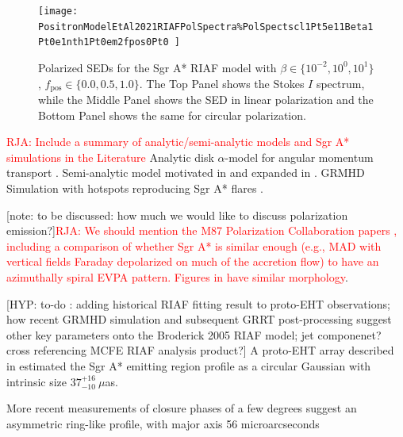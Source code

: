 \documentclass[twocolumn,tighten,dvipsnames,linenumbers]{aastex63}
\newcommand\note[1]{{\color{OliveGreen}[note: #1]}}
\newcommand\hyp[1]{{\color{Salmon}[HYP: #1]}}
\begin{document}
\begin{figure}%
  \texttt{[image: PositronModelEtAl2021RIAFPolSpectra\%PolSpectscl1Pt5e11Beta1Pt0e1nth1Pt0em2fpos0Pt0
]}
  \caption{Polarized SEDs for the Sgr A* RIAF model with  $\beta\in\{10^{-2},10^{0},10^{1}\}$, $f_\mathrm{pos}\in\{0.0,0.5,1.0\}$. The Top Panel shows the Stokes $I$ spectrum, while the Middle Panel shows the SED in linear polarization and the Bottom Panel shows the same for circular polarization.}
  \label{fig:EmamiRIAFSpectra}
\end{figure}

\textcolor{red}{RJA: Include a summary of analytic/semi-analytic models and Sgr A* simulations in the Literature} Analytic disk $\alpha$-model for angular momentum transport \cite{Shakura1973}. Semi-analytic model motivated in \cite{Yuan2003} and expanded in \cite{Broderick2011}. GRMHD Simulation with hotspots reproducing Sgr A* flares \cite{Ripperda2020}.

\note{to be discussed: how much we would like to discuss polarization emission?}\textcolor{red}{RJA: We should mention the M87 Polarization Collaboration papers \cite{EHTCPaperVII}, including a comparison of whether Sgr A* is similar enough (e.g., MAD with vertical fields Faraday depolarized on much of the accretion flow) to have an azimuthally spiral EVPA pattern. Figures in  \citep{Emami2021} have similar morphology}.

\hyp{to-do :  adding historical RIAF fitting result to proto-EHT observations; how recent  GRMHD simulation and subsequent GRRT post-processing suggest other key parameters onto the Broderick 2005 RIAF model; jet componenet? cross referencing MCFE RIAF analysis product?} A proto-EHT array described in \cite{Doeleman2008} estimated the Sgr A* emitting region profile as a circular Gaussian with intrinsic size $37^{+16}_{-10}\ \mu$as.


More recent measurements of closure phases of a few degrees \cite{Fish2016} suggest an asymmetric ring-like profile, with major axis 56 microarcseconds




\end{document}
